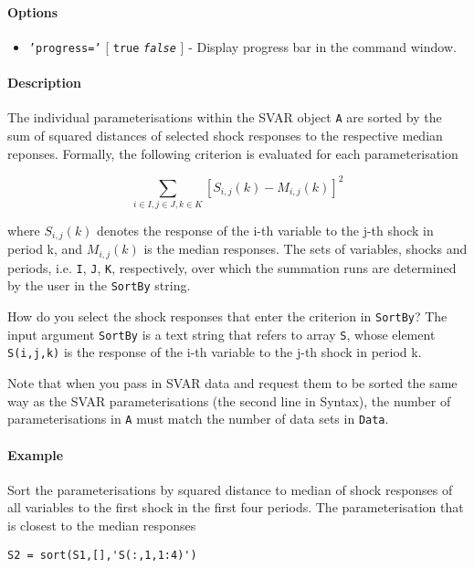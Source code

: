 \paragraph{Options}\label{options}

\begin{itemize}
\itemsep1pt\parskip0pt
\item
  \texttt{'progress='} {[} \texttt{true} \textbar{}
  \emph{\texttt{false}} {]} - Display progress bar in the command
  window.
\end{itemize}

\paragraph{Description}\label{description}

The individual parameterisations within the SVAR object \texttt{A} are
sorted by the sum of squared distances of selected shock responses to
the respective median reponses. Formally, the following criterion is
evaluated for each parameterisation

\[ \sum_{i\in I,j\in J,k\in K} \left[ S_{i,j}(k) - M_{i,j}(k) \right]^2 \]

where $S_{i,j}(k)$ denotes the response of the i-th variable to the j-th
shock in period k, and $M_{i,j}(k)$ is the median responses. The sets of
variables, shocks and periods, i.e. \texttt{I}, \texttt{J}, \texttt{K},
respectively, over which the summation runs are determined by the user
in the \texttt{SortBy} string.

How do you select the shock responses that enter the criterion in
\texttt{SortBy}? The input argument \texttt{SortBy} is a text string
that refers to array \texttt{S}, whose element \texttt{S(i,j,k)} is the
response of the i-th variable to the j-th shock in period k.

Note that when you pass in SVAR data and request them to be sorted the
same way as the SVAR parameterisations (the second line in Syntax), the
number of parameterisations in \texttt{A} must match the number of data
sets in \texttt{Data}.

\paragraph{Example}\label{example}

Sort the parameterisations by squared distance to median of shock
responses of all variables to the first shock in the first four periods.
The parameterisation that is closest to the median responses

\begin{verbatim}
S2 = sort(S1,[],'S(:,1,1:4)')
\end{verbatim}


